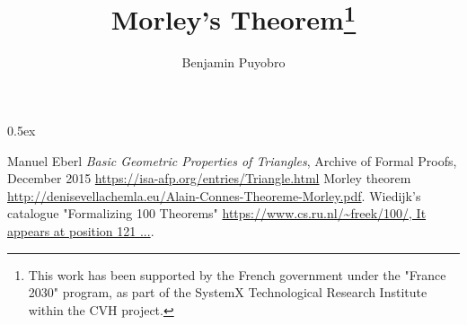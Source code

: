 \documentclass[11pt,a4paper]{article}
\begin{document}
\title{Morley's Theorem\thanks{This work has been supported by the French government under the "France 2030" program, as part of the SystemX Technological Research Institute within the CVH project.}}
\author{Benjamin Puyobro}

\maketitle
\tableofcontents
\newpage
\parindent 0pt\parskip 0.5ex

\begin{thebibliography}{99} %
Manuel Eberl
\textit {Basic Geometric Properties of Triangles}, Archive of Formal Proofs, December 2015
\url{https://isa-afp.org/entries/Triangle.html}
Morley theorem
\url{http://denisevellachemla.eu/Alain-Connes-Theoreme-Morley.pdf}.
Wiedijk's catalogue "Formalizing 100 Theorems"
\url{https://www.cs.ru.nl/~freek/100/, It appears at position 121 ...}.
\end{thebibliography}
%
%
\end{document}
